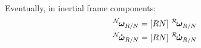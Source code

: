 \documentclass[]{AVSSimReportMemo}
\begin{document}
Eventually, in inertial frame components:
\begin{subequations}
	\begin{align}
		\leftexp{N} {\bm\omega_{R/N}} &= [RN] \textrm{ } \leftexp{R} {\bm\omega_{R/N}} 
		\\
		\leftexp{N} {\bm{\dot\omega}_{R/N}} &= [RN]  \textrm{ } \leftexp{R} {\bm{\dot\omega}_{R/N}}
	\end{align}
\end{subequations}



\end{document}
